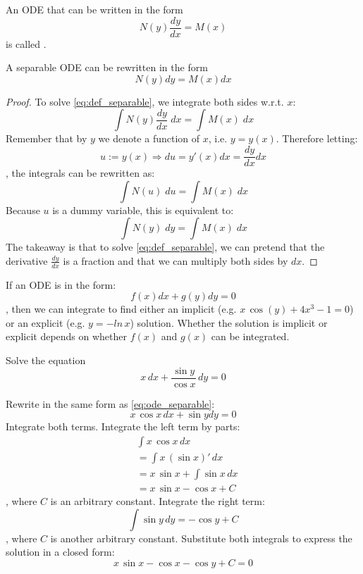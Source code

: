 \documentclass[a4paper]{article}
\begin{document}
\begin{definition}
An ODE that can be written in the form
\begin{equation}
    N(y)\frac{dy}{dx} = M(x)
    \label{eq:def_separable}
\end{equation}
    is called .
\end{definition}
\begin{corollary}
   A separable ODE can be rewritten in the form
    \begin{equation}
        N(y)dy = M(x)dx
        \label{eq:ode_separable}
    \end{equation}
\end{corollary}
\begin{proof}
    To solve \eqref{eq:def_separable}, we integrate both sides w.r.t. $x$:
    \[
    \int N(y)\frac{dy}{dx} \; dx = \int M(x)\; dx
    \]
    Remember that by $y$ we denote a function of $x$, i.e. $y = y(x)$. Therefore letting:
    \[
    u:=y(x) \Rightarrow du = y'(x)dx = \frac{dy}{dx}dx
    \]
    , the integrals can be rewritten as:
    \[
    \int N(u)\; du = \int M(x)\; dx
    \]
    Because $u$ is a dummy variable, this is equivalent to: \[ \int N(y)\; dy = \int M(x)\; dx \]
    The takeaway is that to solve \eqref{eq:def_separable}, we can pretend that the derivative  $\tfrac{dy}{dx}$ is a fraction and that we can multiply both sides by $dx$.
\end{proof}
If an ODE is in the form:
\[
    f(x)dx + g(y)dy = 0
\]
, then we can integrate to find either an implicit (e.g. $x\, \cos(y) + 4x^3 - 1 = 0$) or an explicit (e.g. $y = -ln\, x$) solution. Whether the solution is implicit or explicit depends on whether $f(x)$ and $g(x)$ can be integrated.
\begin{exmp}[no initial condition]
Solve the equation
    \[
        x\, dx + \frac{\sin y}{\cos x}\, dy = 0
    \]
\end{exmp}
\begin{soln}
    Rewrite in the same form as \eqref{eq:ode_separable}:
    \[
    x\, \cos x \, dx + \sin y dy = 0
    \]
    Integrate both terms. Integrate the left term by parts:
    \begin{align*}
        & \int x \, \cos x \, dx  \\
        &= \int x \, (\sin x)' \, dx \\
        &= x\, \sin x + \int \sin x \, dx \\
        &= x\, \sin x - \cos x  + C
    \end{align*}
    , where $C$ is an arbitrary constant. Integrate the right term:
    \[
        \int \sin y \, dy = - \cos y + C
    \]
    , where $C$ is another arbitrary constant. Substitute both integrals to express the solution in a closed form:
    \[
        x\, \sin x - \cos x -\cos y  + C = 0
    \]
\end{soln}
\end{document}
